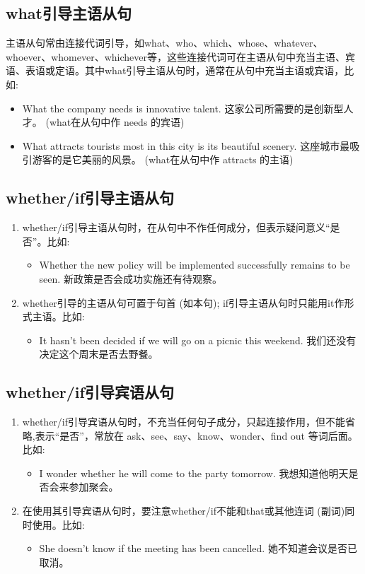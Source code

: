 \subsection{what引导主语从句}

主语从句常由连接代词引导，如what、who、which、whose、whatever、whoever、whomever、whichever等，这些连接代词可在主语从句中充当主语、宾语、表语或定语。其中what引导主语从句时，通常在从句中充当主语或宾语，比如:
\begin{itemize}
  \item What the company needs is innovative talent. 这家公司所需要的是创新型人才。 (what在从句中作 needs 的宾语)
  \item What attracts tourists most in this city is its beautiful scenery. 这座城市最吸引游客的是它美丽的风景。 (what在从句中作 attracts 的主语)
\end{itemize}

\subsection{whether/if引导主语从句}

\begin{enumerate}
  \item whether/if引导主语从句时，在从句中不作任何成分，但表示疑问意义“是否”。比如:
        \begin{itemize}
          \item Whether the new policy will be implemented successfully remains to be seen. 新政策是否会成功实施还有待观察。
        \end{itemize}
  \item whether引导的主语从句可置于句首 (如本句); if引导主语从句时只能用it作形式主语。比如:
        \begin{itemize}
          \item It hasn't been decided if we will go on a picnic this weekend. 我们还没有决定这个周末是否去野餐。
        \end{itemize}
\end{enumerate}

\subsection{whether/if引导宾语从句}

\begin{enumerate}
  \item whether/if引导宾语从句时，不充当任何句子成分，只起连接作用，但不能省略,表示“是否”，常放在 ask、see、say、know、wonder、find out 等词后面。比如:
        \begin{itemize}
          \item I wonder whether he will come to the party tomorrow. 我想知道他明天是否会来参加聚会。
        \end{itemize}
  \item 在使用其引导宾语从句时，要注意whether/if不能和that或其他连词 (副词)同时使用。比如:
        \begin{itemize}
          \item She doesn't know if the meeting has been cancelled. 她不知道会议是否已取消。
        \end{itemize}
\end{enumerate}

